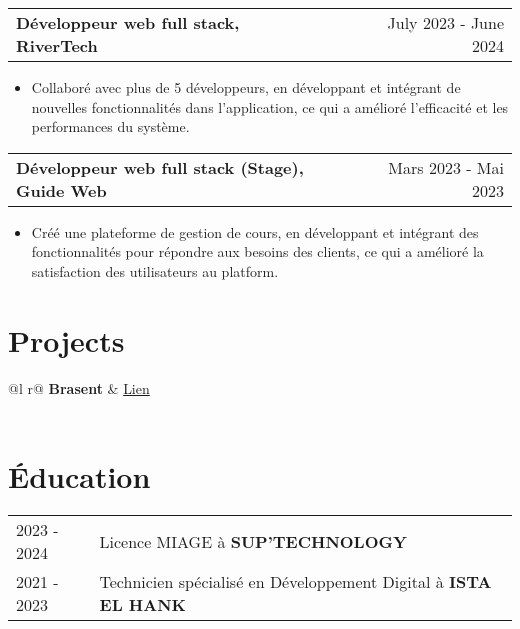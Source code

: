 \documentclass[a4paper,12pt]{article}
\makeatletter
\newenvironment{joblong}[2]
    {
    \begin{tabularx}{\linewidth}{@{}l X r@{}}
    \textbf{#1} & \hfill &  #2 \\[3.75pt]
    \end{tabularx}
    \begin{minipage}[t]{\linewidth}
    \begin{itemize}[nosep,after=\strut, leftmargin=1em, itemsep=3pt,label=--]
    }
    {
    \end{itemize}
    \end{minipage}    
    }
\makeatother
\begin{document}
\begin{joblong}{Développeur web full stack, RiverTech}{July 2023 - June 2024}
\item Collaboré avec plus de 5 développeurs, en développant et intégrant de nouvelles fonctionnalités dans l'application, ce qui a amélioré l'efficacité et les performances du système.
\end{joblong}

\begin{joblong}{Développeur web full stack (Stage), Guide Web}{Mars 2023 - Mai 2023}
\item Créé une plateforme de gestion de cours, en développant et intégrant des fonctionnalités pour répondre aux besoins des clients, ce qui a amélioré la satisfaction des utilisateurs au platform.
\end{joblong}

\section{Projects}

\begin{tabularx}{\linewidth}{ @{}l r@{} }
\textbf{Brasent} & \hfill \href{https://brasent.com/}{Lien} \\[3.75pt]
  \\
\end{tabularx}

\section{Éducation}
\begin{tabularx}{\linewidth}{@{}l X@{}}	
2023 - 2024 & Licence MIAGE à \textbf{SUP’TECHNOLOGY} \hfill \normalsize \\

2021 - 2023 & Technicien spécialisé en Développement Digital à \textbf{ISTA EL HANK} \hfill  \\ 

\end{tabularx}
\end{document}
